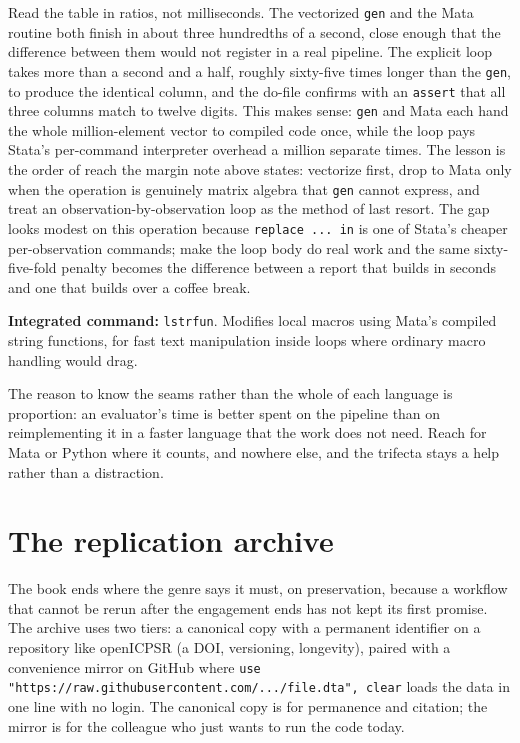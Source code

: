 \documentclass[
    a4paper,
    fontsize=10pt,
    twoside=true,
    numbers=noenddot,
]{kaobook}
\begin{document}
Read the table in ratios, not milliseconds. The vectorized \texttt{gen} and the Mata routine both finish in about three hundredths of a second, close enough that the difference between them would not register in a real pipeline. The explicit loop takes more than a second and a half, roughly sixty-five times longer than the \texttt{gen}, to produce the identical column, and the do-file confirms with an \texttt{assert} that all three columns match to twelve digits. This makes sense: \texttt{gen} and Mata each hand the whole million-element vector to compiled code once, while the loop pays Stata's per-command interpreter overhead a million separate times. The lesson is the order of reach the margin note above states: vectorize first, drop to Mata only when the operation is genuinely matrix algebra that \texttt{gen} cannot express, and treat an observation-by-observation loop as the method of last resort. The gap looks modest on this operation because \texttt{replace ... in} is one of Stata's cheaper per-observation commands; make the loop body do real work and the same sixty-five-fold penalty becomes the difference between a report that builds in seconds and one that builds over a coffee break.

\begin{kaobox}[frametitle=Package Integration: \texttt{lstrfun}]
\textbf{Integrated command:} \texttt{lstrfun}. Modifies local macros using Mata's compiled string functions, for fast text manipulation inside loops where ordinary macro handling would drag.
\end{kaobox}

The reason to know the seams rather than the whole of each language is proportion: an evaluator's time is better spent on the pipeline than on reimplementing it in a faster language that the work does not need. Reach for Mata or Python where it counts, and nowhere else, and the trifecta stays a help rather than a distraction.

\section{The replication archive}\label{sec:archive}
The book ends where the genre says it must, on preservation, because a workflow that cannot be rerun after the engagement ends has not kept its first promise. The archive uses two tiers: a canonical copy with a permanent identifier on a repository like openICPSR (a DOI, versioning, longevity), paired with a convenience mirror on GitHub where \texttt{use "https://raw.githubusercontent.com/.../file.dta", clear} loads the data in one line with no login. The canonical copy is for permanence and citation; the mirror is for the colleague who just wants to run the code today.
\end{document}
